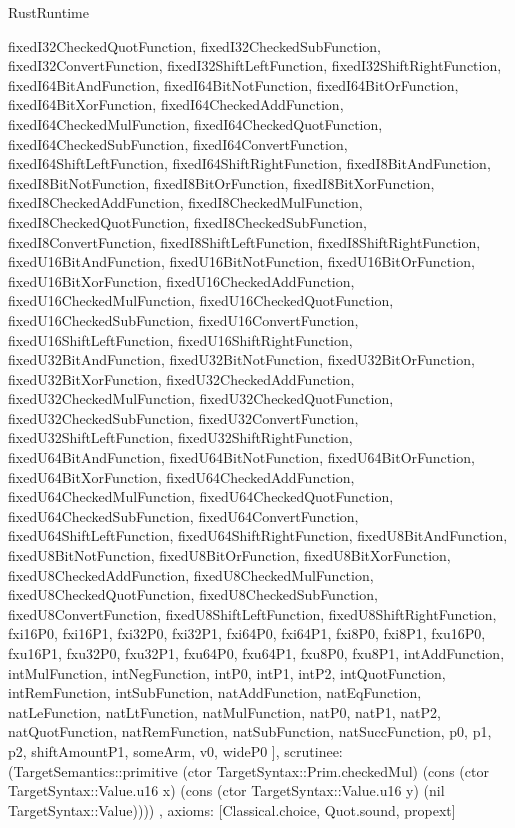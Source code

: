 \begin{lexlean}{RustRuntime}
\begin{semanticmodule}
{{      fixedI32CheckedQuotFunction,
      fixedI32CheckedSubFunction,
      fixedI32ConvertFunction,
      fixedI32ShiftLeftFunction,
      fixedI32ShiftRightFunction,
      fixedI64BitAndFunction,
      fixedI64BitNotFunction,
      fixedI64BitOrFunction,
      fixedI64BitXorFunction,
      fixedI64CheckedAddFunction,
      fixedI64CheckedMulFunction,
      fixedI64CheckedQuotFunction,
      fixedI64CheckedSubFunction,
      fixedI64ConvertFunction,
      fixedI64ShiftLeftFunction,
      fixedI64ShiftRightFunction,
      fixedI8BitAndFunction,
      fixedI8BitNotFunction,
      fixedI8BitOrFunction,
      fixedI8BitXorFunction,
      fixedI8CheckedAddFunction,
      fixedI8CheckedMulFunction,
      fixedI8CheckedQuotFunction,
      fixedI8CheckedSubFunction,
      fixedI8ConvertFunction,
      fixedI8ShiftLeftFunction,
      fixedI8ShiftRightFunction,
      fixedU16BitAndFunction,
      fixedU16BitNotFunction,
      fixedU16BitOrFunction,
      fixedU16BitXorFunction,
      fixedU16CheckedAddFunction,
      fixedU16CheckedMulFunction,
      fixedU16CheckedQuotFunction,
      fixedU16CheckedSubFunction,
      fixedU16ConvertFunction,
      fixedU16ShiftLeftFunction,
      fixedU16ShiftRightFunction,
      fixedU32BitAndFunction,
      fixedU32BitNotFunction,
      fixedU32BitOrFunction,
      fixedU32BitXorFunction,
      fixedU32CheckedAddFunction,
      fixedU32CheckedMulFunction,
      fixedU32CheckedQuotFunction,
      fixedU32CheckedSubFunction,
      fixedU32ConvertFunction,
      fixedU32ShiftLeftFunction,
      fixedU32ShiftRightFunction,
      fixedU64BitAndFunction,
      fixedU64BitNotFunction,
      fixedU64BitOrFunction,
      fixedU64BitXorFunction,
      fixedU64CheckedAddFunction,
      fixedU64CheckedMulFunction,
      fixedU64CheckedQuotFunction,
      fixedU64CheckedSubFunction,
      fixedU64ConvertFunction,
      fixedU64ShiftLeftFunction,
      fixedU64ShiftRightFunction,
      fixedU8BitAndFunction,
      fixedU8BitNotFunction,
      fixedU8BitOrFunction,
      fixedU8BitXorFunction,
      fixedU8CheckedAddFunction,
      fixedU8CheckedMulFunction,
      fixedU8CheckedQuotFunction,
      fixedU8CheckedSubFunction,
      fixedU8ConvertFunction,
      fixedU8ShiftLeftFunction,
      fixedU8ShiftRightFunction,
      fxi16P0,
      fxi16P1,
      fxi32P0,
      fxi32P1,
      fxi64P0,
      fxi64P1,
      fxi8P0,
      fxi8P1,
      fxu16P0,
      fxu16P1,
      fxu32P0,
      fxu32P1,
      fxu64P0,
      fxu64P1,
      fxu8P0,
      fxu8P1,
      intAddFunction,
      intMulFunction,
      intNegFunction,
      intP0,
      intP1,
      intP2,
      intQuotFunction,
      intRemFunction,
      intSubFunction,
      natAddFunction,
      natEqFunction,
      natLeFunction,
      natLtFunction,
      natMulFunction,
      natP0,
      natP1,
      natP2,
      natQuotFunction,
      natRemFunction,
      natSubFunction,
      natSuccFunction,
      p0,
      p1,
      p2,
      shiftAmountP1,
      someArm,
      v0,
      wideP0
    ],
    scrutinee: (TargetSemantics::primitive (ctor TargetSyntax::Prim.checkedMul) (cons (ctor TargetSyntax::Value.u16 x) (cons (ctor TargetSyntax::Value.u16 y) (nil TargetSyntax::Value))))
  },
  axioms: [Classical.choice, Quot.sound, propext]
}


\end{semanticmodule}
\end{lexlean}

